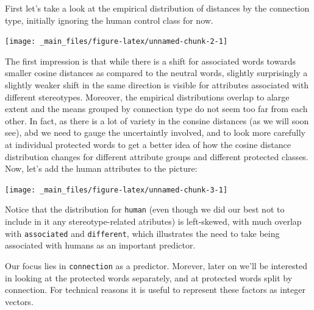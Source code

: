 \documentclass[12pt,]{book}
\begin{document}
First let's take a look at the empirical distribution of distances by
the connection type, initially ignoring the human control class for now.

\vspace{1mm} \footnotesize

\begin{center}\texttt{[image: \_main\_files/figure-latex/unnamed-chunk-2-1]} \end{center}

\normalsize

The first impression is that while there is a shift for associated words
towards smaller cosine distances as compared to the neutral words,
slightly surprisingly a slightly weaker shift in the same direction is
visible for attributes associated with different stereotypes. Moreover,
the empirical distributions overlap to alarge extent and the means
grouped by connection type do not seem too far from each other. In fact,
as there is a lot of variety in the consine distances (as we will soon
see), abd we need to gauge the uncertaintly involved, and to look more
carefully at individual protected words to get a better idea of how the
cosine distance distribution changes for different attribute groups and
different protected classes. Now, let's add the human attributes to the
picture:

\vspace{1mm} \footnotesize

\begin{center}\texttt{[image: \_main\_files/figure-latex/unnamed-chunk-3-1]} \end{center}

\normalsize

\noindent Notice that the distribution for \texttt{human} (even though
we did our best not to include in it any stereotype-related atributes)
is left-skewed, with much overlap with \texttt{associated} and
\texttt{different}, which illustrates the need to take being associated
with humans as an important predictor.

Our focus lies in \texttt{connection} as a predictor. Morever, later on
we'll be interested in looking at the protected words separately, and at
protected words split by connection. For technical reasons it is useful
to represent these factors as integer vectors.

\vspace{1mm} \footnotesize
\end{document}
